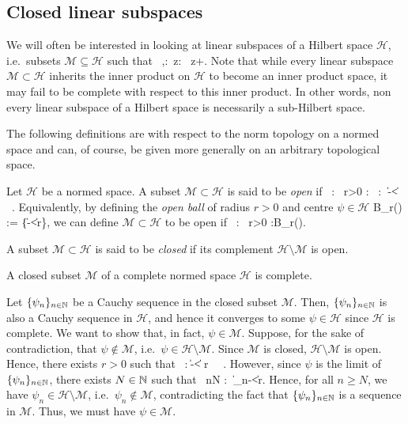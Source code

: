 \subsection{Closed linear subspaces}

We will often be interested in looking at linear subspaces of a Hilbert space $\mathcal{H}$, i.e.\ subsets $\mathcal{M}\subseteq\mathcal{H}$ such that
\bse
\forall \, \psi,\varphi\in{}:\forall \, z\in \C : \ z\psi+\varphi\in {}.
\ese
Note that while every linear subspace $\mathcal{M}\subset \mathcal{H}$ inherits the inner product on $\mathcal{H}$ to become an inner product space, it may fail to be complete with respect to this inner product. In other words, non every linear subspace of a Hilbert space is necessarily a sub-Hilbert space.

The following definitions are with respect to the norm topology on a normed space and can, of course, be given more generally on an arbitrary topological space.

\bd
Let $\mathcal{H}$ be a normed space. A subset $\mathcal{M}\subset \mathcal{H}$ is said to be \emph{open} if
\bse
\forall \, \psi \in {} : \exists \, r>0 : \forall \, \varphi\in {} : \ \|\psi-\varphi\|<\varepsilon \, \Rightarrow\, \varphi\in{}.
\ese
\ed
Equivalently, by defining the \emph{open ball} of radius $r>0$ and centre $\psi\in\mathcal{H}$
\bse
B_r(\psi) := \{\varphi\in{}\mid\|\psi-\varphi\|<r\},
\ese
we can define $\mathcal{M}\subset \mathcal{H}$ to be open if
\bse
\forall \, \psi \in {} : \exists \, r>0 :B_r(\psi)\subseteq{}.
\ese

\bd
A subset $\mathcal{M}\subset \mathcal{H}$ is said to be \emph{closed} if its complement $\mathcal{H}\setminus \mathcal{M}$ is open.
\ed

\bp
A closed subset $\mathcal{M}$ of a complete normed space $\mathcal{H}$ is complete.
\ep

\bq
Let $\{\psi_n\}_{n\in \mathbb{N}}$ be a Cauchy sequence in the closed subset $\mathcal{M}$. Then, $\{\psi_n\}_{n\in \mathbb{N}}$ is also a Cauchy sequence in $\mathcal{H}$, and hence it converges to some $\psi\in\mathcal{H}$ since $\mathcal{H}$ is complete. 
We want to show that, in fact, $\psi\in\mathcal{M}$. Suppose, for the sake of contradiction, that $\psi\notin\mathcal{M}$, i.e.\ $\psi\in\mathcal{H}\setminus\mathcal{M}$. Since $\mathcal{M}$ is closed, $\mathcal{H}\setminus \mathcal{M}$ is open. Hence, there exists $r>0$ such that
\bse
\forall \, \varphi\in{}:\ \|\varphi -\psi\|< r \, \Rightarrow \, \varphi \in {}\setminus {}.
\ese
However, since $\psi$ is the limit of $\{\psi_n\}_{n\in \mathbb{N}}$, there exists $N\in \mathbb{N}$ such that
\bse
\forall \, n\geq N : \ \|\psi_n-\psi\|<r.
\ese
Hence, for all $n\geq N$, we have $\psi_n \in  \mathcal{H}\setminus \mathcal{M}$, i.e.\  $\psi_n \notin\mathcal{M}$, contradicting the fact that  $\{\psi_n\}_{n\in \mathbb{N}}$ is a sequence in $\mathcal{M}$. Thus, we must have $\psi\in\mathcal{M}$.
\eq

